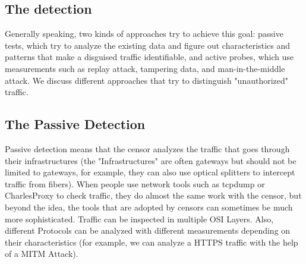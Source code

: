 \documentclass[conference]{IEEEtran}
\begin{document}
\subsection{The detection}\label{sec:detection}
Generally speaking, two kinds of approaches try to achieve this goal: passive tests, which try to analyze the existing data and figure out characteristics and patterns that make a disguised traffic identifiable, and active probes, which use measurements such as replay attack, tampering data, and man-in-the-middle attack. We discuss different approaches that try to distinguish "unauthorized" traffic.

\subsection{The Passive Detection}
Passive detection means that the censor analyzes the traffic that goes through their infrastructures (the "Infrastructures" are often gateways but should not be limited to gateways, for example, they can also use optical splitters to intercept traffic from fibers). When people use network tools such as tcpdump or CharlesProxy\texttrademark{} to check traffic, they do almost the same work with the censor, but beyond the idea, the tools that are adopted by censors can sometimes be much more sophisticated. Traffic can be inspected in multiple OSI Layers. Also, different Protocols can be analyzed with different measurements depending on their characteristics (for example, we can analyze a HTTPS traffic with the help of a MITM Attack).
\end{document}
